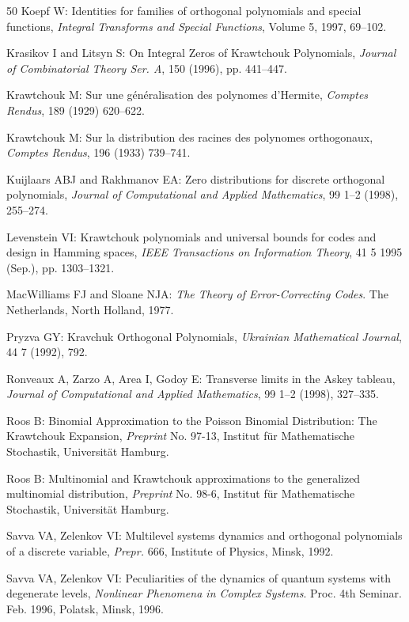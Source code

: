 \begin{thebibliography}{50}
 Koepf W: Identities for families of orthogonal polynomials and special functions, \emph{Integral Transforms and Special Functions}, Volume 5, 1997, 69--102.

 Krasikov I and Litsyn S: On Integral Zeros of Krawtchouk Polynomials, \emph{Journal of Combinatorial Theory Ser. A}, 150 (1996), pp. 441--447.

 Krawtchouk M: Sur une g\'en\'eralisation des polynomes d'Hermite, \emph{Comptes Rendus}, 189 (1929) 620--622.

 Krawtchouk M: Sur la distribution des racines des polynomes orthogonaux, \emph{Comptes Rendus}, 196 (1933) 739--741.

 Kuijlaars ABJ and Rakhmanov EA: Zero distributions for discrete orthogonal polynomials, \emph{Journal of Computational and Applied Mathematics}, 99 1--2 (1998), 255--274.

 Levenstein VI: Krawtchouk polynomials and universal bounds for codes and design in Hamming spaces, \emph{IEEE Transactions on Information Theory}, 41 5 1995 (Sep.), pp. 1303--1321.

 MacWilliams FJ and Sloane NJA: \emph{The Theory of Error-Correcting Codes}. The Netherlands, North Holland, 1977.

 Pryzva GY: Kravchuk Orthogonal Polynomials, \emph{Ukrainian Mathematical Journal}, 44 7 (1992), 792.

 Ronveaux A, Zarzo A, Area I, Godoy E: Transverse limits in the Askey tableau, \emph{Journal of Computational and Applied Mathematics}, 99 1--2 (1998), 327--335.

 Roos B: Binomial Approximation to the Poisson Binomial Distribution: The Krawtchouk Expansion, \emph{Preprint} No. 97-13, Institut f\"ur Mathematische Stochastik, Universit\"at Hamburg.

 Roos B: Multinomial and Krawtchouk approximations to the generalized multinomial distribution, \emph{Preprint} No. 98-6, Institut f\"ur Mathematische Stochastik, Universit\"at Hamburg.

 Savva VA, Zelenkov VI: Multilevel systems dynamics and orthogonal polynomials of a discrete variable, \emph{Prepr.} 666, Institute of Physics, Minsk, 1992.

 Savva VA, Zelenkov VI: Peculiarities of the dynamics of quantum systems with degenerate levels, \emph{Nonlinear Phenomena in Complex Systems}. Proc. 4th Seminar. Feb. 1996, Polatsk, Minsk, 1996.


\end{thebibliography}
